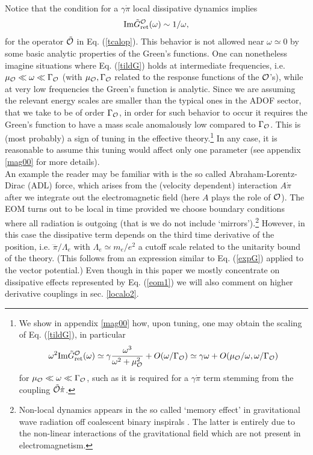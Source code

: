 \documentclass[11pt,amsmath,floats,floatfix,nofootinbib,secnumarabic, superscriptaddress, tightenlines]{revtex4}
\newcommand{\beq}{\begin{equation}}
\newcommand{\eeq}{\end{equation}}
\newcommand{\calo}{{\cal O}}
\begin{document}
Notice that the condition for a $\gamma\dot\pi$ local dissipative dynamics implies
\beq
\label{tildG}
{\rm Im} \tilde G_{\rm ret}^\calo (\omega) \sim 1/\omega,
\eeq
for the operator $\tilde\calo$ in Eq. (\ref{tcalop}). This behavior is not allowed near $\omega\simeq 0$ by some basic analytic properties of the Green's functions. One can nonetheless imagine situations where Eq. (\ref{tildG}) holds at intermediate frequencies, i.e. $\mu_\calo \ll \omega \ll \Gamma_{\calo}$ (with $\mu_\calo, \Gamma_\calo$ related to the response functions of the $\calo$'s), while at very low frequencies the Green's function is analytic. Since we are assuming the relevant energy scales are smaller than the typical ones in the ADOF sector, that we take to be of order $\Gamma_\calo$, in order for such behavior to occur it requires the Green's function to have a mass scale anomalously low compared to $\Gamma_\calo$. This is (most probably) a sign of tuning in the effective theory.\footnote{We show in appendix \ref{mag00} how, upon tuning, one may obtain the scaling of Eq. (\ref{tildG}), in particular 
\beq
\omega^2{\rm Im}{\tilde G}_{\rm ret}^{\calo}(\omega) \simeq \gamma \frac{\omega^3}{\omega^2+\mu_\calo^2} + O(\omega/\Gamma_\calo) \simeq  \gamma\omega + O(\mu_\calo/\omega, \omega/\Gamma_\calo)
\eeq
for $\mu_\calo \ll \omega \ll \Gamma_{\calo}$, such as it is required for a $\gamma\dot\pi$ term stemming from the coupling $\tilde\calo\dot\pi$.}
In any case, it is reasonable to assume this tuning would affect only one parameter (see appendix \ref{mag00} for more details).\\

An example the reader may be familiar with is the so called Abraham-Lorentz-Dirac (ADL) force, which arises from the (velocity dependent) interaction $A \dot\pi$  after we integrate out the electromagnetic field (here $A$ plays the role of $\calo$). The EOM turns out to be local in time \cite{radre} provided we choose boundary conditions where all radiation is outgoing (that is we do not include `mirrors').\footnote{Non-local dynamics appears in the so called `memory effect' in gravitational wave radiation off coalescent binary inspirals \cite{memory}. The latter is entirely due to the non-linear interactions of the gravitational field which are not present in electromagnetism.} However, in this case the dissipative term depends on the third time derivative of the position, i.e. $\dddot \pi/\Lambda_e$ with $\Lambda_e \simeq m_e/e^2$ a cutoff scale related to the unitarity bound of the theory. (This follows from an expression similar to Eq. (\ref{expG}) applied to the vector potential.) Even though in this paper we mostly concentrate on dissipative effects represented by Eq. (\ref{eom1}) we will also comment on higher derivative couplings in sec. \ref{localo2}.\\
\end{document}
